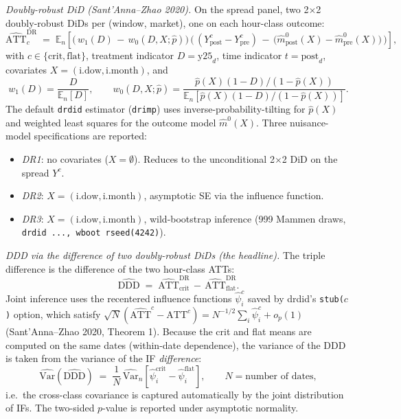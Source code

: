 \documentclass[11pt,a4paper]{article}
\newcommand{\code}[1]{\nolinkurl{#1}}
\begin{document}
\textit{Doubly-robust DiD (Sant'Anna--Zhao 2020).} On the spread panel, two 2$\times$2 doubly-robust DiDs per (window, market), one on each hour-class outcome:
\[
\widehat{\text{ATT}}^{\text{DR}}_{c} \;=\; \mathbb{E}_n\!\left[\Big(\,w_{1}(D)\,-\,w_{0}(D,X;\hat p)\Big)\,\Big(\,(Y^{c}_{\text{post}}-Y^{c}_{\text{pre}})\,-\,\big(\hat m^{0}_{\text{post}}(X)-\hat m^{0}_{\text{pre}}(X)\big)\,\Big)\right],
\]
with $c \in \{\text{crit}, \text{flat}\}$, treatment indicator $D = \text{y25}_d$, time indicator $t = \text{post}_d$, covariates $X = (\text{i.dow}, \text{i.month})$, and
\[
w_{1}(D) = \frac{D}{\mathbb{E}_n[D]}, \qquad
w_{0}(D, X; \hat p) = \frac{\hat p(X)(1-D)/(1-\hat p(X))}{\mathbb{E}_n[\hat p(X)(1-D)/(1-\hat p(X))]}.
\]
The default \code{drdid} estimator (\code{drimp}) uses inverse-probability-tilting for $\hat p(X)$ and weighted least squares for the outcome model $\hat m^{0}(X)$. Three nuisance-model specifications are reported:
\begin{itemize}
\item \emph{DR1}: no covariates ($X = \emptyset$). Reduces to the unconditional 2$\times$2 DiD on the spread $Y^{c}$.
\item \emph{DR2}: $X = (\text{i.dow}, \text{i.month})$, asymptotic SE via the influence function.
\item \emph{DR3}: $X = (\text{i.dow}, \text{i.month})$, wild-bootstrap inference (999 Mammen draws, \texttt{drdid ..., wboot rseed(4242)}).
\end{itemize}

\textit{DDD via the difference of two doubly-robust DiDs (the headline).} The triple difference is the difference of the two hour-class ATTs:
\[
\widehat{\text{DDD}} \;=\; \widehat{\text{ATT}}^{\text{DR}}_{\text{crit}} \,-\, \widehat{\text{ATT}}^{\text{DR}}_{\text{flat}}.
\]
Joint inference uses the recentered influence functions $\hat\psi^{c}_i$ saved by drdid's \texttt{stub(}$c$\texttt{)} option, which satisfy $\sqrt N(\widehat{\text{ATT}}^{c} - \text{ATT}^{c}) = N^{-1/2}\sum_i \hat\psi^{c}_i + o_p(1)$ (Sant'Anna--Zhao 2020, Theorem 1). Because the crit and flat means are computed on the same dates (within-date dependence), the variance of the DDD is taken from the variance of the IF \emph{difference}:
\[
\widehat{\text{Var}}(\widehat{\text{DDD}}) \;=\; \frac{1}{N}\,\widehat{\text{Var}}_n\!\left[\hat\psi^{\text{crit}}_i - \hat\psi^{\text{flat}}_i\right], \qquad N = \text{number of dates},
\]
i.e.\ the cross-class covariance is captured automatically by the joint distribution of IFs. The two-sided $p$-value is reported under asymptotic normality.
\end{document}

